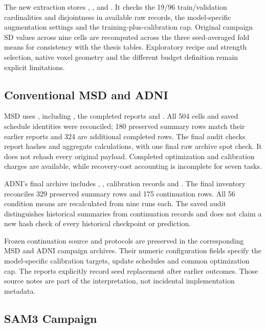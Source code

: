 \documentclass[12pt,a4paper]{article}
\begin{document}
The new extraction stores ,
,  and
. It checks the 19/96 train/validation cardinalities
and disjointness in available raw records, the model-specific
augmentation settings and the training-plus-calibration cap. Original
campaign SD values across nine cells are recomputed across the three
seed-averaged fold means for consistency with the thesis tables.
Exploratory recipe and strength selection, native voxel geometry and
the different budget definition remain explicit limitations.

\subsection{Conventional MSD and ADNI}

MSD uses , including
, the completed reports and
. All 504 cells and saved schedule identities
were reconciled; 180 preserved summary rows match their earlier reports
and 324 are additional completed rows. The final audit checks report
hashes and aggregate calculations, with one final raw archive spot
check. It does not rehash every original payload. Completed optimization
and calibration charges are available, while recovery-cost accounting
is incomplete for seven tasks.

ADNI's final archive includes
, , calibration records and
. The final inventory reconciles 329 preserved
summary rows and 175 continuation rows. All 56 condition means are
recalculated from nine runs each. The saved audit distinguishes
historical summaries from continuation records and does not claim a
new hash check of every historical checkpoint or prediction.

Frozen continuation source and protocols are preserved in the
corresponding MSD and ADNI campaign archives. Their numeric configuration
fields specify the model-specific calibration targets,
update schedules and common optimization cap.
The reports explicitly record seed replacement after earlier outcomes.
Those source notes are part of the interpretation, not incidental
implementation metadata.

\subsection{SAM3 Campaign}
\end{document}

